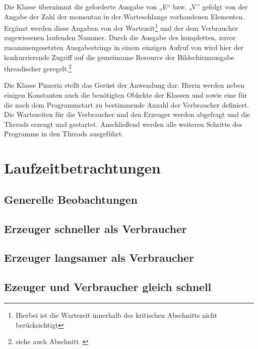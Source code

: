 Die Klasse  übernimmt die geforderte Ausgabe von „E“ bzw. „V” gefolgt von der Angabe der Zahl der momentan in der Warteschlange vorhandenen Elementen. Ergänzt werden diese Angaben von der Wartezeit\footnote{Hierbei ist die Wartezeit innerhalb des kritischen Abschnitts nicht berücksichtigt} und der dem Verbraucher zugewiesenen laufenden Nummer. Durch die Ausgabe des kompletten, zuvor zusammengesetzten Ausgabestrings in einem einzigen Aufruf von  wird hier der konkurrierende Zugriff auf die gemeinsame Resource der Bildschirmausgabe threadischer geregelt.\footnote{siehe auch Abschnitt~}

Die Klasse Pizzeria stellt das Gerüst der Anwendung dar. Hierin werden neben einigen Konstanten auch die benötigten Obkekte der Klassen  und  sowie eine  für die nach dem Programmstart zu bestimmende Anzahl der Verbraucher definiert. Die Wartezeiten für die Verbraucher und den Erzeuger werden abgefragt und die Threads erzeugt und gestartet. Anschließend werden alle weiteren Schritte des Programms in den Threads ausgeführt. 

\newpage
\section{Laufzeitbetrachtungen} %
\label{sec:laufzeitbetrachtungen}

\subsection{Generelle Beobachtungen} %
\label{sub:generelle_beobachtungen}


\subsection{Erzeuger schneller als Verbraucher} %
\label{sub:erzeuger_schneller_als_verbraucher}


\subsection{Erzeuger langsamer als Verbraucher} %
\label{sub:erzeuger_langsamer_als_verbraucher}


\subsection{Ezeuger und Verbraucher gleich schnell} %
\label{sub:ezeuger_und_verbraucher_gleich_schnell}


